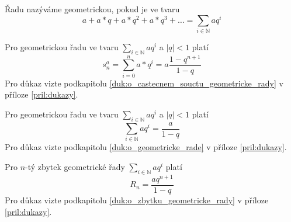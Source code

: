 \begin{definition}
Řadu nazýváme geometrickou, pokud je ve tvaru
\begin{equation}
a + a*q + a*q^2 + a*q^3 +\ldots = \sum_{i\in\mathbb{N}}aq^i
\end{equation}
\end{definition}

\begin{fact}\label{vet:o_castecnem_souctu_geometricke_rady}
Pro geometrickou řadu ve tvaru $\sum_{i\in\mathbb{N}}aq^i$ a $|q|<1$ platí
\begin{equation}
s^a_n=\sum_{i=0}^na*q^i=a\frac{1-q^{n+1}}{1-q}
\end{equation}
Pro důkaz vizte podkapitolu \ref{duk:o_castecnem_souctu_geometricke_rady} v příloze \ref{pril:dukazy}.
\end{fact}

\begin{fact}\label{vet:o_geometricke_rade}
Pro geometrickou řadu ve tvaru $\sum_{i\in\mathbb{N}}aq^i$ a $|q|<1$ platí
\begin{equation}
\sum_{i\in\mathbb{N}}aq^i = \frac{a}{1-q}
\end{equation}
Pro důkaz vizte podkapitolu \ref{duk:o_geometricke_rade} v příloze \ref{pril:dukazy}.
\end{fact}

\begin{fact}\label{vet:o_zbytku_geometricke_rady}
Pro $n$-tý zbytek geometrické řady $\sum_{i\in\mathbb{N}}aq^i$ platí
\begin{equation}
R_n = \frac{aq^{n+1}}{1-q}
\end{equation}
Pro důkaz vizte podkapitolu \ref{duk:o_zbytku_geometricke_rady} v příloze \ref{pril:dukazy}.
\end{fact}